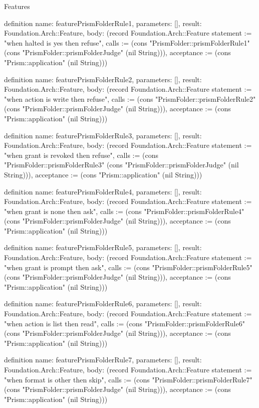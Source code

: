 \begin{lexlean}{Features}
\begin{semanticmodule}
definition{
  name: featurePrismFolderRule1,
  parameters: [],
  result: Foundation.Arch::Feature,
  body: (record Foundation.Arch::Feature {statement := "when halted is yes then refuse", calls := (cons "PrismFolder::prismFolderRule1" (cons "PrismFolder::prismFolderJudge" (nil String))), acceptance := (cons "Prism::application" (nil String))})
}

definition{
  name: featurePrismFolderRule2,
  parameters: [],
  result: Foundation.Arch::Feature,
  body: (record Foundation.Arch::Feature {statement := "when action is write then refuse", calls := (cons "PrismFolder::prismFolderRule2" (cons "PrismFolder::prismFolderJudge" (nil String))), acceptance := (cons "Prism::application" (nil String))})
}

definition{
  name: featurePrismFolderRule3,
  parameters: [],
  result: Foundation.Arch::Feature,
  body: (record Foundation.Arch::Feature {statement := "when grant is revoked then refuse", calls := (cons "PrismFolder::prismFolderRule3" (cons "PrismFolder::prismFolderJudge" (nil String))), acceptance := (cons "Prism::application" (nil String))})
}

definition{
  name: featurePrismFolderRule4,
  parameters: [],
  result: Foundation.Arch::Feature,
  body: (record Foundation.Arch::Feature {statement := "when grant is none then ask", calls := (cons "PrismFolder::prismFolderRule4" (cons "PrismFolder::prismFolderJudge" (nil String))), acceptance := (cons "Prism::application" (nil String))})
}

definition{
  name: featurePrismFolderRule5,
  parameters: [],
  result: Foundation.Arch::Feature,
  body: (record Foundation.Arch::Feature {statement := "when grant is prompt then ask", calls := (cons "PrismFolder::prismFolderRule5" (cons "PrismFolder::prismFolderJudge" (nil String))), acceptance := (cons "Prism::application" (nil String))})
}

definition{
  name: featurePrismFolderRule6,
  parameters: [],
  result: Foundation.Arch::Feature,
  body: (record Foundation.Arch::Feature {statement := "when action is list then read", calls := (cons "PrismFolder::prismFolderRule6" (cons "PrismFolder::prismFolderJudge" (nil String))), acceptance := (cons "Prism::application" (nil String))})
}

definition{
  name: featurePrismFolderRule7,
  parameters: [],
  result: Foundation.Arch::Feature,
  body: (record Foundation.Arch::Feature {statement := "when format is other then skip", calls := (cons "PrismFolder::prismFolderRule7" (cons "PrismFolder::prismFolderJudge" (nil String))), acceptance := (cons "Prism::application" (nil String))})
}


\end{semanticmodule}
\end{lexlean}
